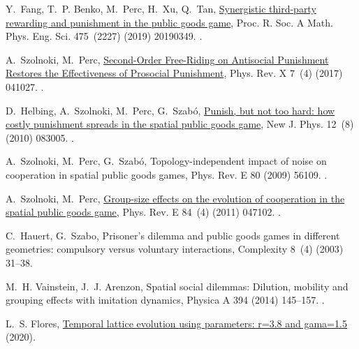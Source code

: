 \documentclass[5p]{elsarticle}
\begin{document}
\begin{thebibliography}{10}
Y.~Fang, T.~P. Benko, M.~Perc, H.~Xu, Q.~Tan,
  \href{https://royalsocietypublishing.org/doi/10.1098/rspa.2019.0349}{{Synergistic
  third-party rewarding and punishment in the public goods game}}, Proc. R.
  Soc. A Math. Phys. Eng. Sci. 475~(2227) (2019) 20190349.
\newblock \href {https://doi.org/10.1098/rspa.2019.0349}
  {}.

A.~Szolnoki, M.~Perc,
  \href{https://link.aps.org/doi/10.1103/PhysRevX.7.041027}{{Second-Order
  Free-Riding on Antisocial Punishment Restores the Effectiveness of Prosocial
  Punishment}}, Phys. Rev. X 7~(4) (2017) 041027.
  \href {https://doi.org/10.1103/PhysRevX.7.041027}
  {}.

D.~Helbing, A.~Szolnoki, M.~Perc, G.~Szabó,
  \href{http://dx.doi.org/10.1088/1367-2630/12/8/083005}{Punish, but not too
  hard: how costly punishment spreads in the spatial public goods game}, New J. Phys. 12~(8) (2010) 083005.
\newblock \href {https://doi.org/10.1088/1367-2630/12/8/083005}
  {}.

A.~Szolnoki, M.~Perc, G.~Szab{\'{o}}, {Topology-independent impact of noise on
  cooperation in spatial public goods games}, Phys. Rev. E 80 (2009) 56109.
\newblock \href {https://doi.org/10.1103/PhysRevE.80.056109}
  {}.

A.~Szolnoki, M.~Perc,
  \href{http://link.aps.org/doi/10.1103/PhysRevE.84.047102}{{Group-size effects
  on the evolution of cooperation in the spatial public goods game}}, Phys.
  Rev. E 84~(4) (2011) 047102.
\newblock \href {https://doi.org/10.1103/PhysRevE.84.047102}
  {}.

C.~Hauert, G.~Szabo, Prisoner's dilemma and public goods games in different
  geometries: compulsory versus voluntary interactions, Complexity 8~(4) (2003)
  31--38.

M.~H. Vainstein, J.~J. Arenzon, {Spatial social dilemmas: Dilution, mobility
  and grouping effects with imitation dynamics}, Physica A 394 (2014) 145--157.
  \href {https://doi.org/10.1016/j.physa.2013.09.032}
  {}.

L.~S. Flores, \href{https://doi.org/10.6084/m9.figshare.13366577.v1}{Temporal
  lattice evolution using parameters: r=3.8 and gama=1.5} (2020).


\end{thebibliography}
\end{document}
